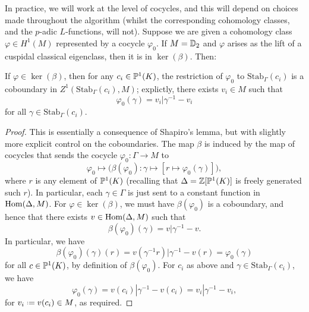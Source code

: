 \documentclass[a4paper,11pt]{article}
\numberwithin{equation}{section}
\begin{document}
In practice, we will work at the level of cocycles, and this will depend on choices made throughout the algorithm (whilst the corresponding cohomology classes, and the $p$-adic $L$-functions, will not). Suppose we are given a cohomology class $\varphi \in H^1(M)$ represented by a cocycle $\varphi_0$. If $M = \mathbb{D}_2$ and $\varphi$ arises as the lift of a cuspidal classical eigenclass, then it is in $\ker(\beta)$. Then:

\begin{proposition}\label{prop:stab coboundaries}
If $\varphi \in \ker(\beta)$, then for any $c_i \in \mathbb{P}^1(K)$, the restriction of $\varphi_0$ to $\mathrm{Stab}_\Gamma(c_i)$ is a coboundary in $Z^1(\mathrm{Stab}_\Gamma(c_i),M)$; explictly, there exists $v_i \in M$ such that
\[
	\varphi_0(\gamma) = v_i|\gamma^{-1} - v_i
\]
for all $\gamma \in \mathrm{Stab}_\Gamma(c_i)$.
\end{proposition}
\begin{proof}
	This is essentially a consequence of Shapiro's lemma, but with slightly more explicit control on the coboundaries. The map $\beta$ is induced by the map of cocycles that sends the cocycle $\varphi_0 : \Gamma \to M$ to
	\[
		\varphi_0 \longmapsto \bigg(\beta\left(\varphi_0\right) : \gamma \mapsto \left[r \mapsto \varphi_0(\gamma)\right]\bigg),
	\]
	where $r$ is any element of $\mathbb{P}^1(K)$ (recalling that $\Delta = \mathbb{Z}[\mathbb{P}^1(K)]$ is freely generated such $r$). In particular, each $\gamma \in \Gamma$ is just sent to a constant function in $\mathrm{Hom}(\Delta,M)$. For $\varphi \in \ker(\beta)$, we must have $\beta(\varphi_0)$ is a coboundary, and hence that there exists $v \in \mathrm{Hom}(\Delta,M)$ such that 
	\[
		\beta(\varphi_0)(\gamma) = v|\gamma^{-1} - v.
	\]
	In particular, we have 
	\[
		\beta(\varphi_0)(\gamma)(r) = v(\gamma^{-1} r)|\gamma^{-1} - v(r) = \varphi_0(\gamma)
	\]
	for all $c \in \mathbb{P}^1(K)$, by definition of $\beta(\varphi_0)$. For $c_i$ as above and $\gamma \in \mathrm{Stab}_\Gamma(c_i)$, we have
	\[
		\varphi_0(\gamma) = v(c_i)|\gamma^{-1} - v(c_i) = v_i|\gamma^{-1} - v_i,
	\]
	for $v_i \defeq v(c_i) \in M$, as required.
\end{proof}
\end{document}
